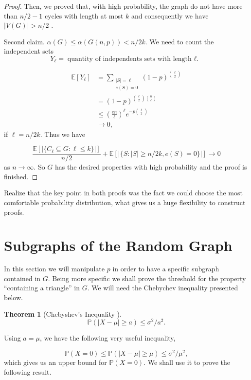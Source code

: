 \documentclass[12pt,twoside,a4paper,bibliography=totocnumbered]{book}
\numberwithin{equation}{section}
\newtheorem{theorem}             {Theorem}[section]
\theoremstyle{remark}
\begin{document}
\begin{proof}
Then, we proved that, with high probability, the graph do not have more than $n/2 -1$ cycles with length at most $k$ and consequently we have $|V(G)| > n/2$ .

Second claim. $\alpha(G) \leq \alpha (G(n,p)) < n/2k$. We need to count the independent sets
$$Y_{\ell} = \text{quantity of independents sets with length ${\ell}$. }$$

\begin{align*}
\mathbb{E}[Y_{\ell}] &= \sum_{\substack{|S| = {\ell} \\ e(S) = 0 }} (1-p)^{\binom{{\ell}}{2}}\\
	       &= (1-p)^{\binom{{\ell}}{2} \binom{n}{{\ell}}} \\
	       &\leq \left(\frac{en}{{\ell}}\right)^{\ell} e^{-p\binom{{\ell}}{2}}\\
	       &\rightarrow 0,
\end{align*}
if $\ell = n/2k$. Thus we have

$$\frac{\mathbb{E}[|\{C_{\ell} \subseteq G \colon {\ell}\leq k \}|]}{n/2} + \mathbb{E} [|\{ S \colon |S| \geq n/2k, e(S) = 0\}|] \rightarrow 0$$
as $n \rightarrow \infty $. So $G$ has the desired properties with high probability and the proof is finished.
\end{proof}

Realize that the key point in both proofs was the fact we could choose the most comfortable probability distribution, what gives us a huge flexibility to construct proofs.

\section{Subgraphs of the Random Graph}

In this section we will manipulate $p$ in order to have a specific subgraph contained in $G$. Being more specific we shall prove the threshold for the property ``containing a triangle'' in $G$.  We will need the Chebychev inequality presented below.

\begin{theorem}[{Chebyshev's Inequality \cite{Ch67}}]
$$\mathbb{P}(|X-\mu| \geq a) \leq \sigma^2/a^2.$$
\end{theorem} 

Using $a = \mu$, we have the following very useful inequality,

$$\mathbb{P}(X=0) \leq \mathbb{P}(|X-\mu | \geq \mu) \leq \sigma^2/\mu^2,$$
which gives us an upper bound for $\mathbb{P}(X=0)$. We shall use it to prove the following result.\\
\end{document}
